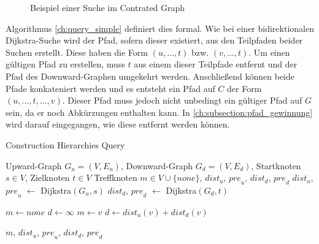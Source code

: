 \begin{figure}[ht]
  \centering
  \caption{Beispiel einer Suche im Contrated Graph}
  \label{fig:ch:beispiel_suche}
\end{figure}

Algorithmus \ref{ch:query_simple} definiert dies formal.
Wie bei einer bidirektionalen Dijkstra-Suche wird der Pfad, sofern dieser existiert, aus den Teilpfaden beider Suchen erstellt.
Diese haben die Form $(u, \dotsc, t)$ bzw. $(v, \dotsc, t)$.
Um einen gültigen Pfad zu erstellen, muss $t$ aus einem dieser Teilpfade entfernt und der Pfad des Downward-Graphen umgekehrt werden.
Anschließend können beide Pfade konkateniert werden und es entsteht ein Pfad auf $C$ der Form $(u, \dotsc, t, \dotsc, v)$.
Dieser Pfad muss jedoch nicht unbedingt ein gültiger Pfad auf $G$ sein, da er noch Abkürzungen enthalten kann.
In \autoref{ch:subsection:pfad_gewinnung} wird darauf eingegangen, wie diese entfernt werden können.

\begin{algorithm}[ht]
  \caption{Construction Hierarchies Query}
  \begin{algorithmic}[1]
    \Require Upward-Graph $G_u = (V, E_u)$, Downward-Graph $G_d = (V, E_d)$, Startknoten $s \in V$, Zielknoten $t \in V$
    \Ensure Treffknoten $m \in V \cup \{ {none} \}$, ${dist}_u$, ${pre}_u$, ${dist}_d$, ${pre}_d$
    \State ${dist}_u$, ${pre}_u$ $\leftarrow$ Dijkstra$(G_u, s)$
    \State ${dist}_d$, ${pre}_d$ $\leftarrow$ Dijkstra$(G_d, t)$

    \State
    \State $m \leftarrow {none}$
    \State $d \leftarrow \infty$
    \State
    \State $m \leftarrow v$
    \State $d \leftarrow {dist}_u(v) + {dist}_d(v)$
    \EndIf
    \EndFor

    \State
    \State \Return $m$, ${dist}_u$, ${pre}_u$, ${dist}_d$, ${pre}_d$
  \end{algorithmic}
  \label{ch:query_simple}
\end{algorithm}


